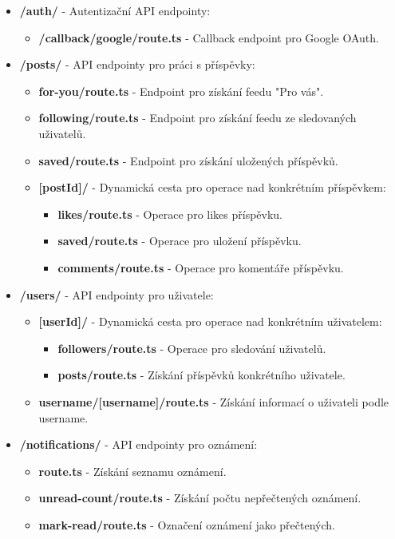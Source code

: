 \documentclass[12pt]{article}
\begin{document}
\begin{itemize}
  \item \textbf{/auth/} - Autentizační API endpointy:
  \begin{itemize}
    \item \textbf{/callback/google/route.ts} - Callback endpoint pro Google OAuth.
  \end{itemize}
  
  \item \textbf{/posts/} - API endpointy pro práci s příspěvky:
  \begin{itemize}
    \item \textbf{for-you/route.ts} - Endpoint pro získání feedu "Pro vás".
    \item \textbf{following/route.ts} - Endpoint pro získání feedu ze sledovaných uživatelů.
    \item \textbf{saved/route.ts} - Endpoint pro získání uložených příspěvků.
    \item \textbf{[postId]/} - Dynamická cesta pro operace nad konkrétním příspěvkem:
    \begin{itemize}
      \item \textbf{likes/route.ts} - Operace pro likes příspěvku.
      \item \textbf{saved/route.ts} - Operace pro uložení příspěvku.
      \item \textbf{comments/route.ts} - Operace pro komentáře příspěvku.
    \end{itemize}
  \end{itemize}
  
  \item \textbf{/users/} - API endpointy pro uživatele:
  \begin{itemize}
    \item \textbf{[userId]/} - Dynamická cesta pro operace nad konkrétním uživatelem:
    \begin{itemize}
      \item \textbf{followers/route.ts} - Operace pro sledování uživatelů.
      \item \textbf{posts/route.ts} - Získání příspěvků konkrétního uživatele.
    \end{itemize}
    \item \textbf{username/[username]/route.ts} - Získání informací o uživateli podle username.
  \end{itemize}
  
  \item \textbf{/notifications/} - API endpointy pro oznámení:
  \begin{itemize}
    \item \textbf{route.ts} - Získání seznamu oznámení.
    \item \textbf{unread-count/route.ts} - Získání počtu nepřečtených oznámení.
    \item \textbf{mark-read/route.ts} - Označení oznámení jako přečtených.
  \end{itemize}
  

\end{itemize}
\end{document}
